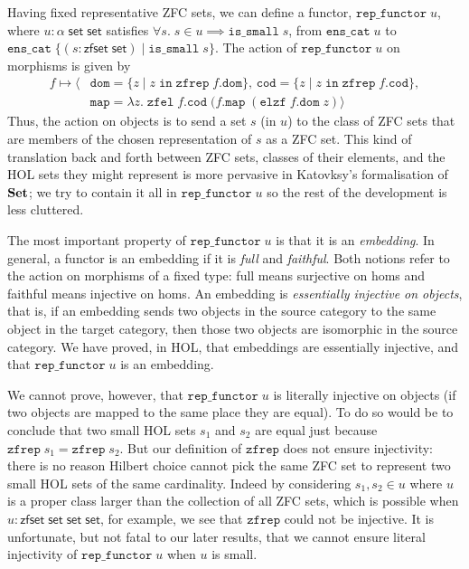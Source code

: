 \documentclass[twoside,titlepage,11pt]{article}
\begin{document}
Having fixed representative ZFC sets, we can define a functor, $\mathtt{rep\_functor}\;u$, where $u:\alpha\;\mathsf{set}\;\mathsf{set}$ satisfies $\forall{s}.\;s\in u\implies\mathtt{is\_small}\;s$, from $\mathtt{ens\_cat}\;u$ to $\mathtt{ens\_cat}\;\{(s:\mathsf{zfset}\;\mathsf{set})\mid\mathtt{is\_small}\;s\}$.
The action of $\mathtt{rep\_functor}\;u$ on morphisms is given by
\begin{align*}
f\mapsto\langle&\mathtt{dom}=\{z\mid z\operatorname{\mathtt{in}}\mathtt{zfrep}\;f.\mathtt{dom}\},\,\mathtt{cod}=\{z\mid z\operatorname{\mathtt{in}}\mathtt{zfrep}\;f.\mathtt{cod}\},\\
&\mathtt{map}=\lambda{z}.\;\mathtt{zfel}\;f.\mathtt{cod}\;(f.\mathtt{map}\;(\mathtt{elzf}\;f.\mathtt{dom}\;z)\rangle
\end{align*}
Thus, the action on objects is to send a set $s$ (in $u$) to the class of ZFC sets that are members of the chosen representation of $s$ as a ZFC set.
This kind of translation back and forth between ZFC sets, classes of their elements, and the HOL sets they might represent is more pervasive in Katovksy's formalisation of $\mathbf{Set}$; we try to contain it all in $\mathtt{rep\_functor}\;u$ so the rest of the development is less cluttered.

The most important property of $\mathtt{rep\_functor}\;u$ is that it is an \emph{embedding}.
In general, a functor is an embedding if it is \emph{full} and \emph{faithful}.
Both notions refer to the action on morphisms of a fixed type: full means surjective on homs and faithful means injective on homs.
An embedding is \emph{essentially injective on objects}, that is, if an embedding sends two objects in the source category to the same object in the target category, then those two objects are isomorphic in the source category.
We have proved, in HOL, that embeddings are essentially injective, and that $\mathtt{rep\_functor}\;u$ is an embedding.

We cannot prove, however, that $\mathtt{rep\_functor}\;u$ is literally injective on objects (if two objects are mapped to the same place they are equal).
To do so would be to conclude that two small HOL sets $s_1$ and $s_2$ are equal just because $\mathtt{zfrep}\;s_1=\mathtt{zfrep}\;s_2$.
But our definition of $\mathtt{zfrep}$ does not ensure injectivity: there is no reason Hilbert choice cannot pick the same ZFC set to represent two small HOL sets of the same cardinality.
Indeed by considering $s_1,s_2\in u$ where $u$ is a proper class larger than the collection of all ZFC sets, which is possible when $u:\mathsf{zfset}\;\mathsf{set}\;\mathsf{set}\;\mathsf{set}$, for example, we see that $\mathtt{zfrep}$ could not be injective.
It is unfortunate, but not fatal to our later results, that we cannot ensure literal injectivity of $\mathtt{rep\_functor}\;u$ when $u$ is small.
\end{document}
